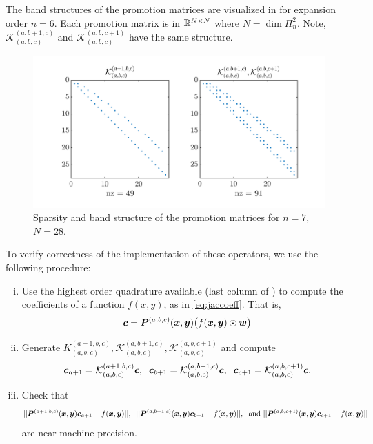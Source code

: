 The band structures of the promotion matrices are visualized in  for expansion order $n=6$. Each promotion matrix is in $\mathbb{R}^{N\times N}$ where $N=\dim\Pi_{n}^2$. Note, $\mathcal{K}_{(a,b,c)}^{(a,b+1,c)}$ and $\mathcal{K}_{(a,b,c)}^{(a,b,c+1)}$ have the same structure.
\begin{figure}[H]
	\centering
	\includegraphics[width=1\linewidth]{./figures/promote_mat}
	\caption{Sparsity and band structure of the promotion matrices for $n=7$, $N=28$.}\label{fig:promotemat}
\end{figure}
To verify correctness of the implementation of these operators, we use the following procedure:
\begin{enumerate}[(i)]
\item Use the highest order quadrature available (last column of ) to compute the coefficients of a function $f(x,y)$, as in \eqref{eq:jaccoeff}. That is, $$\boldsymbol{c} = \boldsymbol{P}^{(a,b,c)}(\boldsymbol{x},\boldsymbol{y})\big(f(\boldsymbol{x},\boldsymbol{y}) \odot \boldsymbol{w}\big)$$
\item Generate $K_{(a,b,c)}^{(a+1,b,c)},\mathcal{K}_{(a,b,c)}^{(a,b+1,c)},\mathcal{K}_{(a,b,c)}^{(a,b,c+1)}$ and compute $$\boldsymbol{c}_{a+1} = \mathcal{K}_{(a,b,c)}^{(a+1,b,c)}\boldsymbol{c},\;\; \boldsymbol{c}_{b+1} = \mathcal{K}_{(a,b,c)}^{(a,b+1,c)}\boldsymbol{c},\;\; \boldsymbol{c}_{c+1} = \mathcal{K}_{(a,b,c)}^{(a,b,c+1)}\boldsymbol{c}.$$
\item Check that $$||\boldsymbol{P}^{(a+1,b,c)}(\boldsymbol{x},\boldsymbol{y})\boldsymbol{c}_{a+1} - f(\boldsymbol{x},\boldsymbol{y})||,\;\;||\boldsymbol{P}^{(a,b+1,c)}(\boldsymbol{x},\boldsymbol{y})\boldsymbol{c}_{b+1} - f(\boldsymbol{x},\boldsymbol{y})||,\;\text{ and }||\boldsymbol{P}^{(a,b,c+1)}(\boldsymbol{x},\boldsymbol{y})\boldsymbol{c}_{c+1} - f(\boldsymbol{x},\boldsymbol{y})||$$ are near machine precision.
\end{enumerate}


